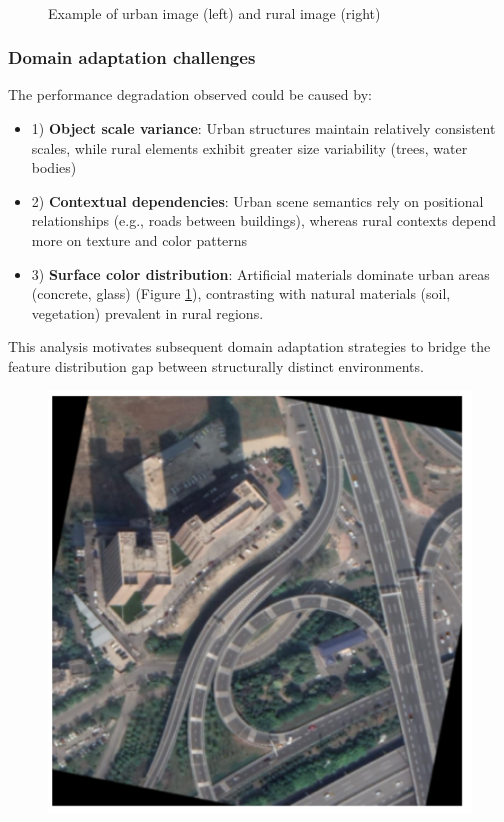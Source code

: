 \documentclass{article}
\begin{document}
\begin{multicols}{2}
\begin{figure}[H]
\begin{minipage}{0.48\linewidth}
	\end{minipage}
	\caption{Example of urban image (left) and rural image (right)}
	\label{fig:dataset_mix}

	\hfill
	\\


\end{figure}



\subsubsection{Domain adaptation challenges}
The performance degradation observed could be caused by:  
\begin{itemize}
\item1) \textbf{Object scale variance}: Urban structures maintain relatively consistent scales, while rural elements exhibit greater size variability (trees, water bodies)  
\item2) \textbf{Contextual dependencies}: Urban scene semantics rely on positional relationships (e.g., roads between buildings), whereas rural contexts depend more on texture and color patterns  
\item3) \textbf{Surface color distribution}: Artificial materials dominate urban areas (concrete, glass) (Figure \ref{fig:dataset_mix}), contrasting with natural materials (soil, vegetation) prevalent in rural regions.
\end{itemize}
This analysis motivates subsequent domain adaptation strategies to bridge the feature distribution gap between structurally distinct environments.

\begin{figure}[H]
	\centering
	\begin{minipage}{0.48\linewidth}
		\centering
		\includegraphics[width=1\linewidth]{image/aug/4_aug1+urban.png}


\end{minipage}
\end{figure}
\end{multicols}
\end{document}
